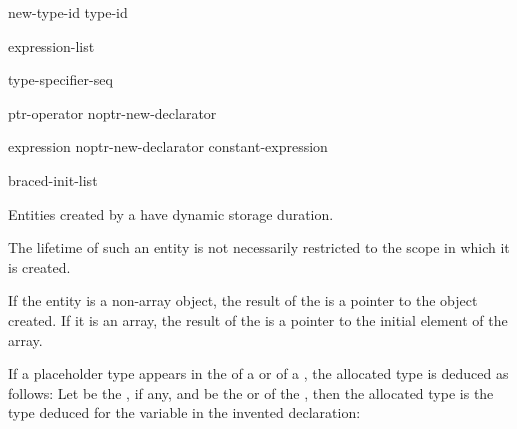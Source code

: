 \begin{bnf}
\br
    \opt{\terminal{::}}   new-type-id  \br
    \opt{\terminal{::}}   \terminal{(} type-id \terminal{)} 
\end{bnf}

%
%
\begin{bnf}
\br
    \terminal{(} expression-list \terminal{)}
\end{bnf}

\begin{bnf}
\br
    type-specifier-seq 
\end{bnf}

\begin{bnf}
\br
    ptr-operator  \br
    noptr-new-declarator
\end{bnf}

\begin{bnf}
\br
    \terminal{[} expression \terminal{]} \br
    noptr-new-declarator \terminal{[} constant-expression \terminal{]} 
\end{bnf}

\begin{bnf}
\br
    \terminal{(}  \terminal{)}\br
    braced-init-list
\end{bnf}

%
Entities created by a  have dynamic storage
duration.
\begin{note}
%
The lifetime of such an entity is not necessarily restricted to the
scope in which it is created.
\end{note}
If the entity is a non-array object, the result of the 
is a pointer to the object created. If it is an array, the result of the
 is a pointer to the initial element of
the array.

\pnum
If a placeholder type appears in the
 of a  or
 of a ,
the allocated type is deduced as follows:
Let
 be the , if any,
and
 be the  or  of
the , then the allocated type is the type
deduced for the variable  in the invented
declaration:

